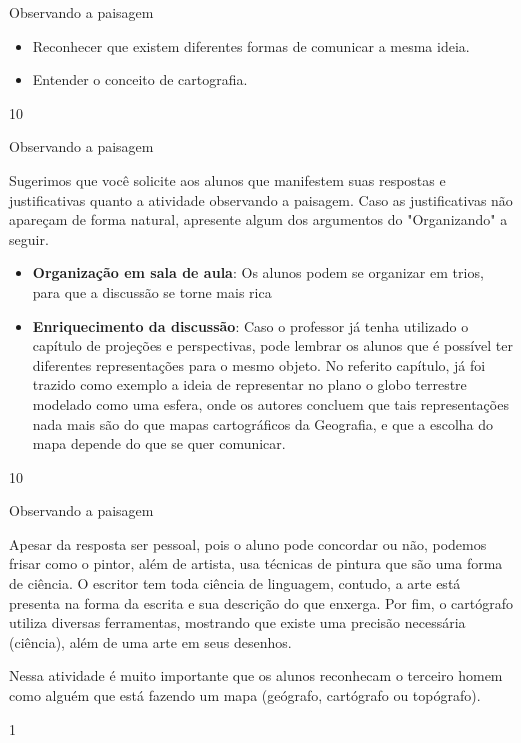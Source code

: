 \begin{ObjetivoEsp}{Observando a paisagem}
{
	\begin{itemize}
	\item Reconhecer que existem diferentes formas de comunicar a mesma ideia.
	\item Entender o conceito de cartografia.
	\end{itemize}
}{1}{0}
\end{ObjetivoEsp}
\vspace{-.5em}
\begin{Recomenda}{Observando a paisagem}
{
	Sugerimos que você solicite aos alunos que manifestem suas respostas e justificativas quanto a atividade observando a paisagem. Caso as justificativas não apareçam de forma natural, apresente algum dos argumentos do "Organizando" a seguir.
	\begin{itemize}
	\item \textbf{Organização em sala de aula}: Os alunos podem se organizar em trios, para que a discussão se torne mais rica
	\item \textbf{Enriquecimento da discussão}: Caso o professor já tenha utilizado o capítulo de projeções e perspectivas, pode lembrar os alunos que é possível ter diferentes representações para o mesmo objeto. No referito capítulo, já foi trazido como exemplo a ideia de representar no plano o globo terrestre modelado como uma esfera, onde os autores concluem que tais representações nada mais são do que mapas cartográficos da Geografia, e que a escolha do mapa depende do que se quer comunicar.
	\end{itemize}
}{1}{0}
\end{Recomenda}
\begin{resposta}{Observando a paisagem}
{
	Apesar da resposta ser pessoal, pois o aluno pode concordar ou não, podemos frisar como o pintor, além de artista, usa técnicas de pintura que são uma forma de ciência. O escritor tem toda ciência de linguagem, contudo, a arte está presenta na forma da escrita e sua descrição do que enxerga. Por fim, o cartógrafo utiliza diversas ferramentas, mostrando que existe uma precisão necessária (ciência), além de uma arte em seus desenhos.

	Nessa atividade é muito importante que os alunos reconhecam o terceiro homem como alguém que está fazendo um mapa (geógrafo, cartógrafo ou topógrafo).
}{1}
\end{resposta}

